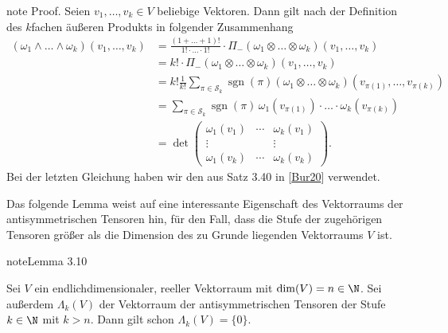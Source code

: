 \documentclass[letterpaper,10pt,english]{jupyterBook}
\begin{document}
\begin{sphinxadmonition}{note}
\sphinxAtStartPar
Proof. Seien \(v_1,\ldots,v_k \in V\) beliebige Vektoren.
Dann gilt nach der Definition des \(k\)\sphinxhyphen{}fachen äußeren Produkts in {\hyperref[\detokenize{vektoranalysis/tensor:equation-eq-kfachesprodukt}]{}} folgender Zusammenhang
\begin{equation*}
\begin{split}(\omega_1 \wedge \ldots \wedge \omega_k)(v_1, \ldots, v_k) &= \frac{(1+\ldots+1)!}{1!\cdot\ldots\cdot1!} \cdot \Pi_-(\omega_1 \otimes \ldots \otimes \omega_k)(v_1,\ldots,v_k) \\
&= k! \cdot \Pi_-(\omega_1 \otimes \ldots \otimes \omega_k)(v_1,\ldots,v_k) \\
&= k! \frac{1}{k!} \sum_{\pi\in \mathcal{S}_k}\operatorname{sgn}(\pi) (\omega_1 \otimes \ldots \otimes \omega_k)(v_{\pi(1)},\ldots,v_{\pi(k)}) \\
&= \sum_{\pi\in \mathcal{S}_k}\operatorname{sgn}(\pi) \, \omega_1(v_{\pi(1)})\cdot \ldots \cdot \omega_k(v_{\pi(k)}) \\
&= \operatorname{det}
\begin{pmatrix}
\omega_1(v_1) & \cdots & \omega_k(v_1)\\
\vdots & & \vdots \\
\omega_1(v_k) & \cdots & \omega_k(v_k)
\end{pmatrix}.\end{split}
\end{equation*}
\sphinxAtStartPar
Bei der letzten Gleichung haben wir den  aus Satz 3.40 in {[}\hyperlink{cite.references:id2}{Bur20}{]} verwendet.
\end{sphinxadmonition}

\sphinxAtStartPar
Das folgende Lemma weist auf eine interessante Eigenschaft des Vektorraums der antisymmetrischen Tensoren hin, für den Fall, dass die Stufe der zugehörigen Tensoren größer als die Dimension des zu Grunde liegenden Vektorraums \(V\) ist.
\label{vektoranalysis/tensor:lem:tensorStufe}
\begin{sphinxadmonition}{note}{Lemma 3.10}



\sphinxAtStartPar
Sei \(V\) ein endlich\sphinxhyphen{}dimensionaler, reeller Vektorraum mit \(\operatorname{dim}(V) = n \in \N\).
Sei außerdem \(\Lambda_k(V)\) der Vektorraum der antisymmetrischen Tensoren der Stufe \(k\in\N\) mit \(k > n\).
Dann gilt schon \(\Lambda_k(V) = \lbrace 0 \rbrace\).
\end{sphinxadmonition}
\end{document}
